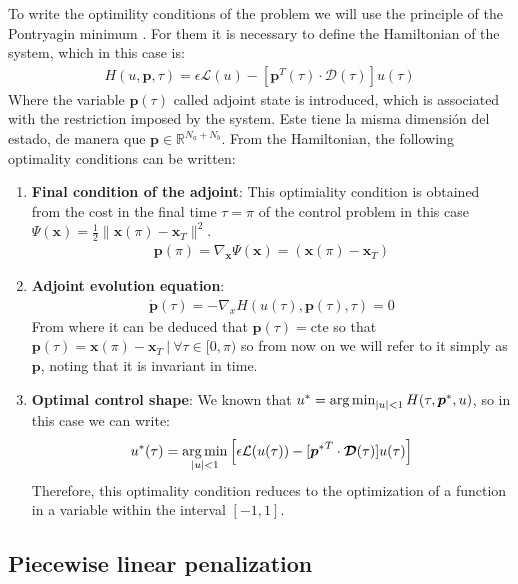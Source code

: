 To write the optimility conditions of the problem we will use the principle of the Pontryagin minimum \cite[Chapter~2.7]{bryson1975applied}. For them it is necessary to define the Hamiltonian of the system, which in this case is:
\begin{gather}\label{hamil}
    H(u,\bm{p},\tau) = 
    \epsilon \mathcal{L}(u) -
    [\bm{p}^T(\tau) \cdot \bm{\mathcal{D}}(\tau)]
    u(\tau)
\end{gather}
Where the variable $ \bm{p} (\tau) $ called adjoint state is introduced, which is associated with the restriction imposed by the system. Este tiene la misma dimensión del estado, de manera que $\bm{p} \in \mathbb{R}^{N_a + N_b}$. From the Hamiltonian, the following optimality conditions can be written:
\begin{enumerate}

    \item \textbf{Final condition of the adjoint}: This optimiality condition is obtained from the cost in the final time $\tau = \pi$ of the control problem in this case $ \Psi (\bm{x}) = \frac {1}{2} \| \bm{x} (\pi) - \bm{x}_T \|^2 $.
    \begin{gather}
        \bm{p}(\pi) = \nabla_{\bm{x}} \Psi(\bm{x}) =  (\bm{x} (\pi) - \bm{x}_T)
    \end{gather}
    \item \textbf{Adjoint evolution equation}: 
    \begin{gather}
        \dot{\bm{p}}(\tau) = -\nabla_x H(u(\tau),\bm{p}(\tau),\tau) = 0
    \end{gather}
    From where it can be deduced that $ \bm {p} (\tau) = \text {cte} $ so that $ \bm {p} (\tau) = \bm {x} (\pi) - \bm { x} _T \ | \ \forall \tau \in [0, \pi) $ so from now on we will refer to it simply as $ \bm {p} $, noting that it is invariant in time.
    \item \textbf{Optimal control shape}: We known that $ u^* = \operatorname*{arg\,min}_{|u|<1} H(\tau,\bm{p}^*,u)$, so in this case we can write:
    \begin{gather}
        u^*(\tau) = \operatorname*{arg\,min}_{|u|<1}  \Big[   \epsilon \mathcal{L}(u(\tau)) -
        [{\bm{p}^*}^T \cdot \bm{\mathcal{D}}(\tau)]
        u(\tau) \Big]
    \end{gather}
    Therefore, this optimality condition reduces to the optimization of a function in a variable within the interval $ [- 1,1] $. 

\end{enumerate}
%
\subsection{Piecewise linear penalization}

